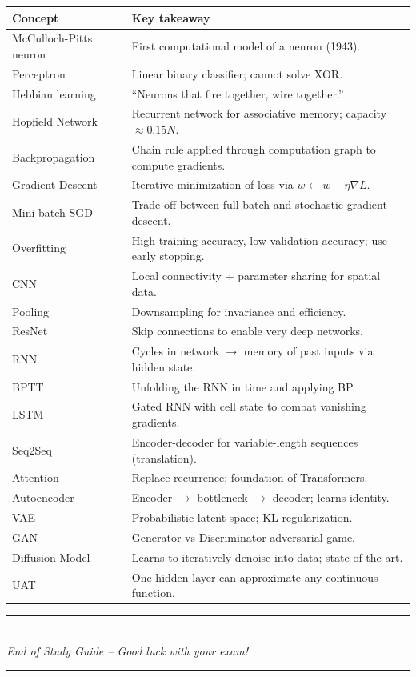 \documentclass[11pt,a4paper]{article}
\begin{document}
\begin{center}
\begin{tabular}{p{4cm} p{10cm}}
\toprule
\textbf{Concept} & \textbf{Key takeaway} \\
\midrule
McCulloch-Pitts neuron & First computational model of a neuron (1943). \\
Perceptron & Linear binary classifier; cannot solve XOR. \\
Hebbian learning & ``Neurons that fire together, wire together.'' \\
Hopfield Network & Recurrent network for associative memory; capacity $\approx 0.15N$. \\
Backpropagation & Chain rule applied through computation graph to compute gradients. \\
Gradient Descent & Iterative minimization of loss via $w \leftarrow w - \eta\nabla L$. \\
Mini-batch SGD & Trade-off between full-batch and stochastic gradient descent. \\
Overfitting & High training accuracy, low validation accuracy; use early stopping. \\
CNN & Local connectivity + parameter sharing for spatial data. \\
Pooling & Downsampling for invariance and efficiency. \\
ResNet & Skip connections to enable very deep networks. \\
RNN & Cycles in network $\to$ memory of past inputs via hidden state. \\
BPTT & Unfolding the RNN in time and applying BP. \\
LSTM & Gated RNN with cell state to combat vanishing gradients. \\
Seq2Seq & Encoder-decoder for variable-length sequences (translation). \\
Attention & Replace recurrence; foundation of Transformers. \\
Autoencoder & Encoder $\to$ bottleneck $\to$ decoder; learns identity. \\
VAE & Probabilistic latent space; KL regularization. \\
GAN & Generator vs Discriminator adversarial game. \\
Diffusion Model & Learns to iteratively denoise into data; state of the art. \\
UAT & One hidden layer can approximate any continuous function. \\
\bottomrule
\end{tabular}
\end{center}

\vfill
\begin{center}
\rule{0.5\textwidth}{0.4pt}\\
\textit{End of Study Guide -- Good luck with your exam!}\\
\rule{0.5\textwidth}{0.4pt}
\end{center}
\end{document}
